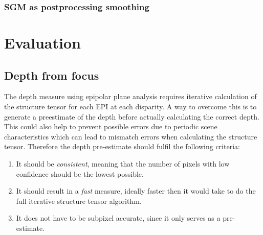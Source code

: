 \documentclass  [
  paper    = a4,
  BCOR     = 10mm,
  twoside,
  fontsize = 12pt,
  fleqn,
  toc      = bibnumbered,
  toc      = listofnumbered,
  numbers  = noendperiod,
  headings = normal,
  listof   = leveldown,
  version  = 3.03
]                                       {scrreprt}
\begin{document}
\subsection{SGM as postprocessing smoothing}



\chapter{Evaluation}
\label{Evaluation}
\section{Depth from focus}
\label{sec: depth from focus}
The depth measure using epipolar plane analysis requires iterative calculation of the structure tensor for each EPI at each disparity. A way to overcome this is to generate a preestimate of the depth before actually calculating the correct depth. This could also help to prevent possible errors due to periodic scene characteristics which can lead to mismatch errors when calculating the structure tensor. Therefore the depth pre-estimate should fulfil the following criteria:
\begin{enumerate}
	\item It should be \textit{consistent}, meaning that the number of pixels with low confidence should be the lowest possible.
	\item It should result in a \textit{fast} measure, ideally faster then it would take to do the full iterative structure tensor algorithm.
	\item It does not have to be subpixel accurate, since it only serves as a pre-estimate. 
\end{enumerate}
\end{document}
